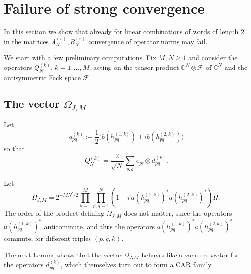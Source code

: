 \documentclass[11pt]{article}
\begin{document}
\section{Failure of strong convergence}
In this section we show that already for linear combinations of words of length $2$ in the matrices $A_N^{(r)}, B_N^{(r)}$ convergence of operator norms may fail.

We start with a few preliminary computations. Fix $M,N\geq 1$ and consider the operators $Q_N^{(k)}$, $k=1,\dots,M$, acting on the tensor product $\mathbb{C}^N\otimes \mathscr{F}$ of $\mathbb{C}^N$ and the antisymmetric Fock space $\mathscr{F}$. 

\subsection{The vector $\Omega_{J,M}$}
Let \[
d^{(k)}_{pq}:=\frac12\bigl(b(h^{(1,k)}_{pq})+i b(h^{(2,k)}_{pq})\bigr)
\] so that 
\[ Q_N^{(k)} = \frac{2}{\sqrt{N}}\sum_{p,q} e_{pq} \otimes  d^{(k)}_{pq}.\]

Let 
\[
    \Omega_{J,M}
    =
    2^{-MN^2/2}
    \prod_{k=1}^M\prod_{p,q=1}^N
    \left(
      1-i\,a(h^{(1,k)}_{pq})^*a(h^{(2,k)}_{pq})^*
    \right)\Omega,
\]
The order of the product defining $\Omega_{J,M}$ does not matter, since the operators $a(h^{(1,k)}_{pq})^*$ anticommute, and thus the operators $a(h^{(1,k)}_{pq})^*a(h^{(2,k)}_{pq})^*$ commute, for different triples $(p,q,k)$.

The next Lemma shows that the vector $\Omega_{J,M}$ behaves like a vacuum vector for the operators $d_{pq}^{(k)}$, which themselves turn out to form a CAR family.
\end{document}

